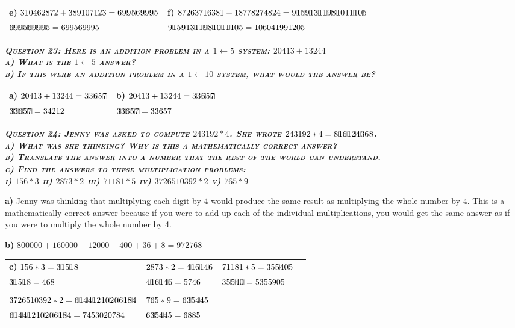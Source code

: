 \documentclass{article}
\begin{document}
\begin{tabular}{l l l}
    \textbf{e)} $310462872+389107123=6\vline9\vline9\vline5\vline6\vline9\vline9\vline9\vline5$ & \textbf{f)} $87263716381+18778274824=9\vline15\vline9\vline13\vline11\vline9\vline8\vline10\vline11\vline10\vline5$
    & \\
    $6\vline9\vline9\vline5\vline6\vline9\vline9\vline9\vline5=699569995$ & $9\vline15\vline9\vline13\vline11\vline9\vline8\vline10\vline11\vline10\vline5=106041991205$
\end{tabular}

\textbf{\emph{\textsc{Question 23: Here is an addition problem in a $1 \leftarrow 5$ system: $20413+13244$ \\
a) What is the $1 \leftarrow 5$ answer? \\
b) If this were an addition problem in a $1 \leftarrow 10$ system, what would the answer be?}}}

\begin{tabular}{l l l}
    \textbf{a)} $20413+13244=3\vline3\vline6\vline5\vline7\vline$ & \textbf{b)} $20413+13244=3\vline3\vline6\vline5\vline7\vline$ 
    & \\
    $3\vline3\vline6\vline5\vline7\vline=34212$ & $3\vline3\vline6\vline5\vline7\vline=33657$
\end{tabular}

\newpage

\textbf{\emph{\textsc{Question 24: Jenny was asked to compute $243192*4$. She wrote $243192*4=8\vline16\vline12\vline4\vline36\vline8$. \\
a) What was she thinking? Why is this a mathematically correct answer? \\
b) Translate the answer into a number that the rest of the world can understand. \\
c) Find the answers to these multiplication problems: \\
i) $156*3$ ii) $2873*2$ iii) $71181*5$ iv) $3726510392*2$ v) $765*9$ }}}

\textbf{a)} Jenny was thinking that multiplying each digit by 4 would produce the same result as multiplying the whole number by 4. This is a mathematically correct answer because if you were to add up each of the individual multiplications, you would get the same answer as if you were to multiply the whole number by 4.

\textbf{b)} $800000+160000+12000+400+36+8=972768$

\begin{tabular}{l l l l}
   \textbf{c)} $156*3=3\vline15\vline18$ & $2873*2=4\vline16\vline14\vline6$ & $71181*5=35\vline5\vline40\vline5$
   & \\
   $3\vline15\vline18=468$ & $4\vline16\vline14\vline6=5746$ & $35\vline5\vline40\vline=5355905$
   & \\ \\
   $3726510392*2=6\vline14\vline4\vline12\vline10\vline2\vline0\vline6\vline18\vline4$ & $765*9=63\vline54\vline45$ &
   & \\
   $6\vline14\vline4\vline12\vline10\vline2\vline0\vline6\vline18\vline4=7453020784$ & $63\vline54\vline45=6885$ &
\end{tabular}
\end{document}
